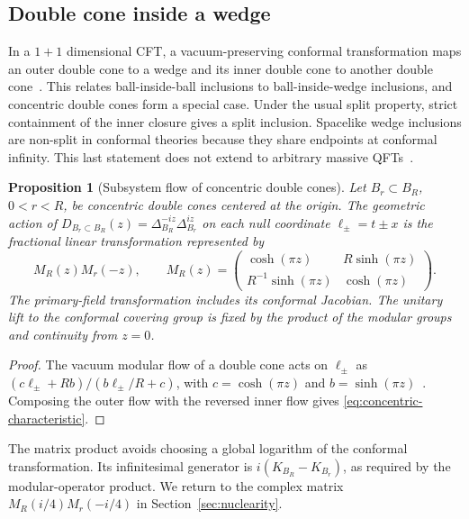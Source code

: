 \documentclass[a4paper,11pt]{article}
\newtheorem{proposition}[theorem]{Proposition}
\theoremstyle{definition}
\begin{document}
\subsection{Double cone inside a wedge}
\label{subsec:ball-inside-wedge}

In a $1+1$ dimensional CFT, a vacuum-preserving conformal transformation maps an outer double cone to a wedge and its inner double cone to another double cone~\cite{BrunettiGuidoLongo1993}. This relates ball-inside-ball inclusions to ball-inside-wedge inclusions, and concentric double cones form a special case. Under the usual split property, strict containment of the inner closure gives a split inclusion. Spacelike wedge inclusions are non-split in conformal theories because they share endpoints at conformal infinity. This last statement does not extend to arbitrary massive QFTs~\cite{Tanimoto2014}.

\begin{proposition}[Subsystem flow of concentric double cones]
\label{thm:concentric-characteristic}
Let $B_r\subset B_R$, $0<r<R$, be concentric double cones centered at the origin. The geometric action of $D_{B_r\subset B_R}(z)=\Delta_{B_R}^{-iz}\Delta_{B_r}^{iz}$ on each null coordinate $\ell_\pm=t\pm x$ is the fractional linear transformation represented by
\begin{equation}
 M_R(z)M_r(-z),\qquad
 M_R(z)=
 \begin{pmatrix}
  \cosh(\pi z)&R\sinh(\pi z)\\
  R^{-1}\sinh(\pi z)&\cosh(\pi z)
 \end{pmatrix}.
 \label{eq:concentric-characteristic}
\end{equation}
The primary-field transformation includes its conformal Jacobian. The unitary lift to the conformal covering group is fixed by the product of the modular groups and continuity from $z=0$.
\end{proposition}
\begin{proof}
The vacuum modular flow of a double cone acts on $\ell_\pm$ as $(c\ell_\pm+Rb)/(b\ell_\pm/R+c)$, with $c=\cosh(\pi z)$ and $b=\sinh(\pi z)$~\cite{HislopLongo1982}. Composing the outer flow with the reversed inner flow gives \eqref{eq:concentric-characteristic}.
\end{proof}

The matrix product avoids choosing a global logarithm of the conformal transformation. Its infinitesimal generator is $i(K_{B_R}-K_{B_r})$, as required by the modular-operator product. We return to the complex matrix $M_R(i/4)M_r(-i/4)$ in Section~\ref{sec:nuclearity}.
\end{document}
